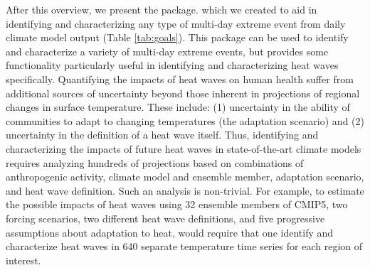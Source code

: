 After this overview, we present the  package. which
we created to aid in identifying and characterizing any type of
multi-day extreme event from daily climate model output (Table
\ref{tab:goals}). This package can be used to identify and characterize
a variety of multi-day extreme events, but provides some functionality
particularly useful in identifying and characterizing heat waves
specifically. Quantifying the impacts of heat waves on human health
suffer from additional sources of uncertainty beyond those inherent in
projections of regional changes in surface temperature. These include:
(1) uncertainty in the ability of communities to adapt to changing
temperatures (the adaptation scenario) and (2) uncertainty in the
definition of a heat wave itself. Thus, identifying and characterizing
the impacts of future heat waves in state-of-the-art climate models
requires analyzing hundreds of projections based on combinations of
anthropogenic activity, climate model and ensemble member, adaptation
scenario, and heat wave definition. Such an analysis is non-trivial. For
example, to estimate the possible impacts of heat waves using 32
ensemble members of CMIP5, two forcing scenarios, two different heat
wave definitions, and five progressive assumptions about adaptation to
heat, would require that one identify and characterize heat waves in 640
separate temperature time series for each region of interest.

